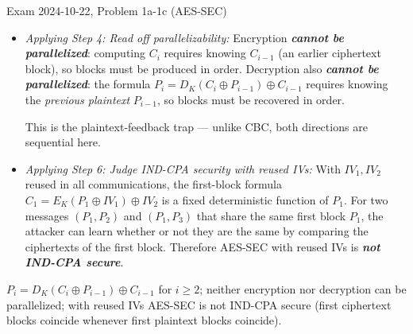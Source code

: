 \documentclass[12pt, a4paper]{article}
\newcommand{\term}[1]{\textbf{\textit{#1}}}        %
\begin{document}
\begin{practicebox}{Exam 2024-10-22, Problem 1a-1c (AES-SEC)}
\begin{itemize}
\[
C_i = E_K(P_i \oplus C_{i-1}) \oplus P_{i-1}
\]

\[
C_i \oplus P_{i-1} = E_K(P_i \oplus C_{i-1})
\]

\[
D_K(C_i \oplus P_{i-1}) = P_i \oplus C_{i-1}
\]

\[
P_i = D_K(C_i \oplus P_{i-1}) \oplus C_{i-1}.
\] Each line uses only the XOR-cancellation facts ($x \oplus x = 0$) and $D_K(E_K(x)) = x$.
    \item \textit{Applying Step 4: Read off parallelizability:} Encryption \term{cannot be parallelized}: computing $C_i$ requires knowing $C_{i-1}$ (an earlier ciphertext block), so blocks must be produced in order.
    Decryption also \term{cannot be parallelized}: the formula $P_i = D_K(C_i \oplus P_{i-1}) \oplus C_{i-1}$ requires knowing the \emph{previous plaintext} $P_{i-1}$, so blocks must be recovered in order.

    This is the plaintext-feedback trap --- unlike CBC, both directions are sequential here.
    \item \textit{Applying Step 6: Judge IND-CPA security with reused IVs:} With $IV_1, IV_2$ reused in all communications, the first-block formula $C_1 = E_K(P_1 \oplus IV_1) \oplus IV_2$ is a fixed deterministic function of $P_1$.
    For two messages $(P_1, P_2)$ and $(P_1, P_3)$ that share the same first block $P_1$, the attacker can learn whether or not they are the same by comparing the ciphertexts of the first block. Therefore AES-SEC with reused IVs is \term{not IND-CPA secure}.
\end{itemize}

\begin{answerbox}
$P_i = D_K(C_i \oplus P_{i-1}) \oplus C_{i-1}$ for $i \geq 2$; neither encryption nor decryption can be parallelized; with reused IVs AES-SEC is not IND-CPA secure (first ciphertext blocks coincide whenever first plaintext blocks coincide).
\end{answerbox}
\end{practicebox}
\end{document}
